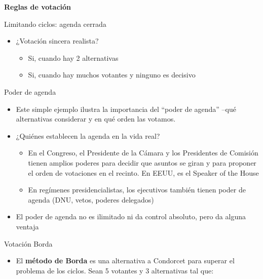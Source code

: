 \documentclass[
  ignorenonframetext,
]{beamer}
\providecommand{\tightlist}{%
  \setlength{\itemsep}{0pt}\setlength{\parskip}{0pt}}\usepackage{longtable,booktabs,array}
\begin{document}
\begin{frame}{\textbf{Reglas de votación}}
\begin{block}{Limitando ciclos: agenda cerrada}
\begin{itemize}
  \begin{itemize}
  \tightlist
  \item
    \(B\) vota por \(z\) en ronda 1 y obtiene \(y\) en ronda 2
    pero\ldots{}
  \item
    \(A\) y \(C\) también querrán ser estrategicos

    \begin{itemize}
    \tightlist
    \item
      equilibrios múltiples surgen facilmente
    \end{itemize}
  \end{itemize}
\item
  ¿Votación sincera realista?

  \begin{itemize}
  \tightlist
  \item
    Si, cuando hay 2 alternativas
  \item
    Si, cuando hay muchos votantes y ninguno es decisivo
  \end{itemize}
\end{itemize}
\end{block}

\begin{block}{Poder de agenda}
\protect\hypertarget{poder-de-agenda}{}
\begin{itemize}
\tightlist
\item
  Este simple ejemplo ilustra la importancia del ``poder de agenda''
  --qué alternativas considerar y en qué orden las votamos.
\item
  ¿Quiénes establecen la agenda en la vida real?

  \begin{itemize}
  \tightlist
  \item
    En el Congreso, el Presidente de la Cámara y los Presidentes de
    Comisión tienen amplios poderes para decidir que asuntos se giran y
    para proponer el orden de votaciones en el recinto. En EEUU, es el
    Speaker of the House
  \item
    En regímenes presidencialistas, los ejecutivos también tienen poder
    de agenda (DNU, vetos, poderes delegados)
  \end{itemize}
\item
  El poder de agenda no es ilimitado ni da control absoluto, pero da
  alguna ventaja
\end{itemize}
\end{block}

\begin{block}{Votación Borda}
\protect\hypertarget{votaciuxf3n-borda}{}
\begin{itemize}
\tightlist
\item
  El \textbf{método de Borda} es una alternativa a Condorcet para
  superar el problema de los ciclos. Sean 5 votantes y 3 alternativas
  tal que:
\end{itemize}


\end{block}
\end{frame}
\end{document}
